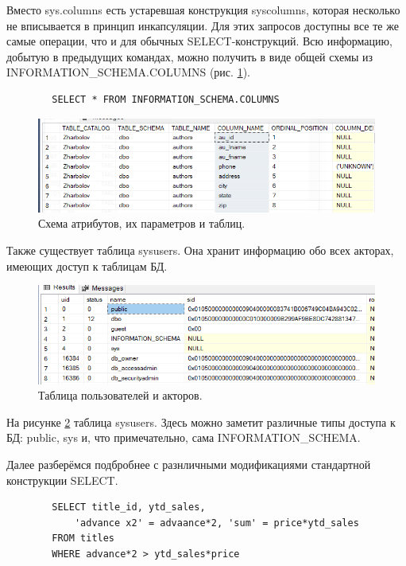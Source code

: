 Вместо sys.columns есть устаревшая конструкция syscolumns, которая несколько не вписывается в принцип инкапсуляции. Для этих запросов доступны все те же самые операции, что и для обычных SELECT-конструкций. Всю информацию, добытую в предыдущих командах, можно получить в виде общей схемы из INFORMATION\_SCHEMA.COLUMNS (рис. \ref{fig:INFSCHEMA}). 

\begin{verbatim}
        SELECT * FROM INFORMATION_SCHEMA.COLUMNS        
\end{verbatim}

\begin{figure}[h!]
    \centering
    \includegraphics[width=0.9\linewidth]{Pic/lab4/SQ14.PNG}
    \caption{Схема атрибутов, их параметров и таблиц.}
    \label{fig:INFSCHEMA}
\end{figure}

Также существует таблица sysusers. Она хранит информацию обо всех акторах, имеющих доступ к таблицам БД.
\begin{figure}
    \centering
    \includegraphics[width=0.9\linewidth]{Pic/lab4/SQ15.PNG}
    \caption{Таблица пользователей и акторов.}
    \label{fig:INFSCHEMT}
\end{figure}

На рисунке \ref{fig:INFSCHEMT} таблица sysusers. Здесь можно заметит различные типы доступа к БД: public, sys и, что примечательно, сама INFORMATION\_SCHEMA.

Далее разберёмся подбробнее с разнличными модификациями стандартной конструкции SELECT.

\begin{verbatim}
        SELECT title_id, ytd_sales, 
            'advance x2' = advaance*2, 'sum' = price*ytd_sales
        FROM titles
        WHERE advance*2 > ytd_sales*price
\end{verbatim}

